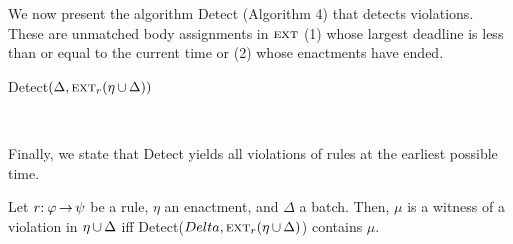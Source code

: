 We now present the algorithm {\sf Detect} (Algorithm 4)
that detects violations.
These are unmatched body assignments in $\textsc{ext}$
(1) whose largest deadline is less than or equal to the current time
or
(2) whose enactments have ended.

\begin{algorithm}[ht]
\caption{{\sf Detect}$(\Delta,\textsc{ext}_r(\eta\,{\cup}\,\Delta))$}
\label{alg:detect}
\begin{small}\vspace*{-2.5mm}
  \begin{flushleft}
    \\
  \end{flushleft}\vspace*{-3.5mm}
  \begin{algorithmic}[1]
        \EndIf
        \If{$\tmsp_\Delta \geq \tau$}
        \EndIf
      \EndIf
    \EndFor
  \end{algorithmic}
\end{small}
\end{algorithm}

Finally,
we state that {\sf Detect} yields
all violations of rules at the earliest possible time.

\begin{thm}\label{thm:II}
  Let $r{:}\:\varphi\,{\rightarrow}\,\psi$ be a rule,
  $\eta$ an enactment,
  and 
  $\Delta$ a batch.
  Then,
  $\mu$ is a witness of a violation in $\eta\,{\cup}\,\Delta$
  iff
  {\sf Detect}($Delta,\textsc{ext}_r(\eta\,{\cup}\,\Delta)$)
  contains $\mu$.
\end{thm}

